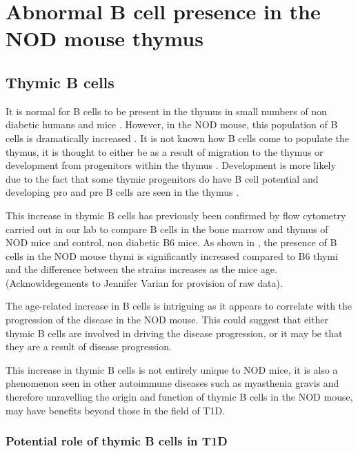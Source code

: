 
\section{Abnormal B cell presence in the NOD mouse thymus}

\subsection{Thymic B cells}
 
It is normal for B cells to be present in the thymus in small numbers \citep{Isaacson1987, Akashi2000, Miyama1988} of non diabetic humans \citep{Isaacson1987} and mice \citep{Akashi2000}. 
However, in the NOD mouse, this population of B cells is dramatically increased \citep{OReilly1994, Serreze1998}.
It is not known how B cells come to populate the thymus, it is thought to either be as a result of migration to the thymus or development from progenitors within the thymus .
Development is more likely due to the fact that some thymic progenitors do have B cell potential \citep{Porritt2004} and developing pro and pre B cells are seen in the thymus \citep{Akashi2000}.

This increase in thymic B cells has previously been confirmed by flow cytometry carried out in our lab to compare B cells in the bone marrow and thymus of NOD mice and control, non diabetic B6 mice.
As shown in , the presence of B cells in the NOD mouse thymi is significantly increased compared to B6 thymi and the difference between the strains increases as the mice age. (Acknowldegements to Jennifer Varian for provision of raw data).

The age-related increase in B cells is intriguing as it appears to correlate with the progression of the disease in the NOD mouse.
This could suggest that either thymic B cells are involved in driving the disease progression, or it may be that they are a result of disease progression.

This increase in thymic B cells is not entirely unique to NOD mice, it is also a phenomenon seen in other autoimmune diseases such as myasthenia gravis \citep{Vrolix2014, Christensson1998} and therefore unravelling the origin and function of thymic B cells in the NOD mouse, may have benefits beyond those in the field of T1D.


\subsubsection{Potential role of thymic B cells in T1D}

